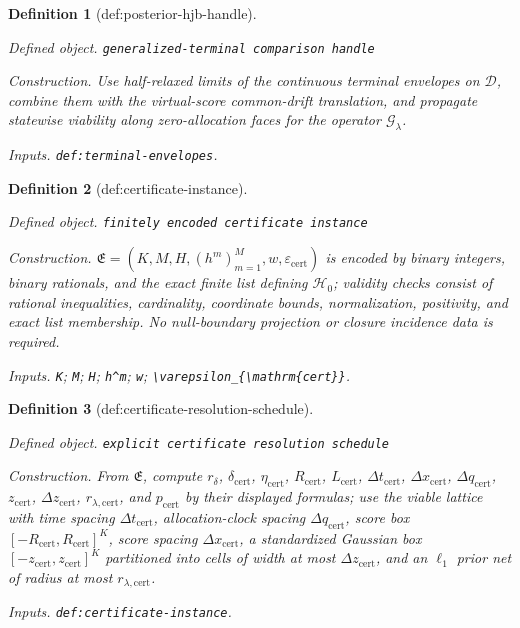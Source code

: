 \documentclass{article}
\newtheorem{definition}{Definition}
\begin{document}
\begin{definition}[def:posterior-hjb-handle]\label{def:posterior-hjb-handle}
\par\smallskip\noindent\emph{Defined object.} \texttt{generalized-\allowbreak{}terminal comparison handle}
\par\smallskip\noindent\emph{Construction.} Use half-relaxed limits of the continuous terminal envelopes on \(\mathcal D\), combine them with the virtual-score common-drift translation, and propagate statewise viability along zero-allocation faces for the operator \(\mathcal G_\lambda\).
\par\smallskip\noindent\emph{Inputs.} \texttt{def:\allowbreak{}terminal-\allowbreak{}envelopes}.
\end{definition}

\begin{definition}[def:certificate-instance]\label{def:certificate-instance}
\par\smallskip\noindent\emph{Defined object.} \texttt{finitely encoded certificate instance}
\par\smallskip\noindent\emph{Construction.} \(\mathfrak E=(K,M,H,(h^m)_{m=1}^M,w,\varepsilon_{\mathrm{cert}})\) is encoded by binary integers, binary rationals, and the exact finite list defining \(\mathcal H_0\); validity checks consist of rational inequalities, cardinality, coordinate bounds, normalization, positivity, and exact list membership.  No null-boundary projection or closure incidence data is required.
\par\smallskip\noindent\emph{Inputs.} \texttt{K}; \texttt{M}; \texttt{H}; \texttt{h\textasciicircum{}m}; \texttt{w}; \texttt{\textbackslash{}\allowbreak{}varepsilon\_\allowbreak{}\{\textbackslash{}\allowbreak{}mathrm\{cert\}\allowbreak{}\}\allowbreak{}}.
\end{definition}

\begin{definition}[def:certificate-resolution-schedule]\label{def:certificate-resolution-schedule}
\par\smallskip\noindent\emph{Defined object.} \texttt{explicit certificate resolution schedule}
\par\smallskip\noindent\emph{Construction.} From \(\mathfrak E\), compute \(r_\delta\), \(\delta_{\mathrm{cert}}\), \(\eta_{\mathrm{cert}}\), \(R_{\mathrm{cert}}\), \(L_{\mathrm{cert}}\), \(\Delta t_{\mathrm{cert}}\), \(\Delta x_{\mathrm{cert}}\), \(\Delta q_{\mathrm{cert}}\), \(z_{\mathrm{cert}}\), \(\Delta z_{\mathrm{cert}}\), \(r_{\lambda,\mathrm{cert}}\), and \(p_{\mathrm{cert}}\) by their displayed formulas; use the viable lattice with time spacing \(\Delta t_{\mathrm{cert}}\), allocation-clock spacing \(\Delta q_{\mathrm{cert}}\), score box \([-R_{\mathrm{cert}},R_{\mathrm{cert}}]^K\), score spacing \(\Delta x_{\mathrm{cert}}\), a standardized Gaussian box \([-z_{\mathrm{cert}},z_{\mathrm{cert}}]^K\) partitioned into cells of width at most \(\Delta z_{\mathrm{cert}}\), and an \(\ell_1\) prior net of radius at most \(r_{\lambda,\mathrm{cert}}\).
\par\smallskip\noindent\emph{Inputs.} \texttt{def:\allowbreak{}certificate-\allowbreak{}instance}.
\end{definition}
\end{document}
